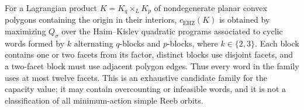 \begin{theorem}
\label{thm:lagrangian-product-finite-enumeration}
For a Lagrangian product \(K=K_q\times_L K_p\) of nondegenerate planar convex
polygons containing the origin in their interiors, \(c_{\mathrm{EHZ}}(K)\) is
obtained by maximizing \(Q_\sigma\) over the Haim--Kislev quadratic programs
associated to cyclic words formed by $k$ alternating $q$-blocks and
$p$-blocks, where $k\in\{2,3\}$. Each block contains one or two facets
from its factor, distinct blocks use
disjoint facets, and a two-facet block must use adjacent polygon edges. Thus
every word in the family uses at most twelve facets. This is an exhaustive
candidate family for the capacity value; it may contain
overcounting or infeasible words, and it is not a classification of all
minimum-action simple Reeb orbits.
\end{theorem}

